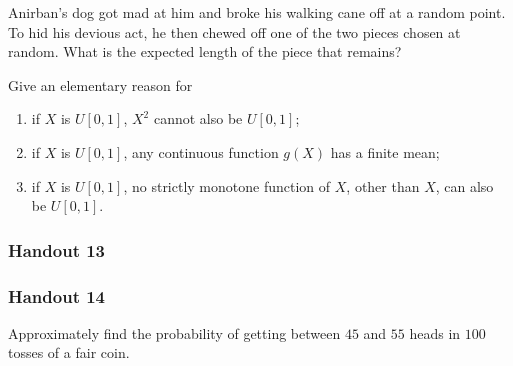 \begin{problem}[Handout 12, \# 12]
  Anirban's dog got mad at him and broke his walking cane off at a random
  point. To hid his devious act, he then chewed off one of the two pieces
  chosen at random. What is the expected length of the piece that remains?
\end{problem}
\begin{solution*}
\end{solution*}

\begin{problem}[Handout 12, \# 14]
  Give an elementary reason for
  \begin{enumerate}[label=(\alph*),noitemsep]
  \item if \(X\) is \(U[0,1]\), \(X^2\) cannot also be \(U[0,1]\);
  \item if \(X\) is \(U[0,1]\), any continuous function \(g(X)\) has a
    finite mean;
  \item if \(X\) is \(U[0,1]\), no strictly monotone function of \(X\),
    other than \(X\), can also be \(U[0,1]\).
  \end{enumerate}
\end{problem}
\begin{solution*}
\end{solution*}

\subsubsection{Handout 13}
\begin{problem}
\end{problem}
\begin{solution*}
\end{solution*}

\begin{problem}
\end{problem}
\begin{solution*}
\end{solution*}

\begin{problem}
\end{problem}
\begin{solution*}
\end{solution*}

\subsubsection{Handout 14}
\begin{problem}[Handout 14, \# 2]
  Approximately find the probability of getting between \(45\) and \(55\)
  heads in \(100\) tosses of a fair coin.
\end{problem}
\begin{solution*}
\end{solution*}

